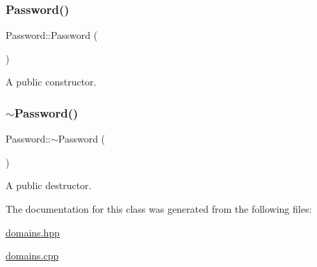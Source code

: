 \subsubsection{\texorpdfstring{Password()}{Password()}}
{\footnotesize\ttfamily Password\+::\+Password (\begin{DoxyParamCaption}{ }\end{DoxyParamCaption})}

A public constructor. \mbox{\label{class_password_ae019a63cb7332cb1c4e41d8ab7b4a619}} 
\subsubsection{\texorpdfstring{$\sim$\+Password()}{~Password()}}
{\footnotesize\ttfamily Password\+::$\sim$\+Password (\begin{DoxyParamCaption}{ }\end{DoxyParamCaption})}

A public destructor. 

The documentation for this class was generated from the following files\+:\begin{DoxyCompactItemize}
\item 
\hyperlink{domains_8hpp}{domains.\+hpp}\item 
\hyperlink{domains_8cpp}{domains.\+cpp}\end{DoxyCompactItemize}
